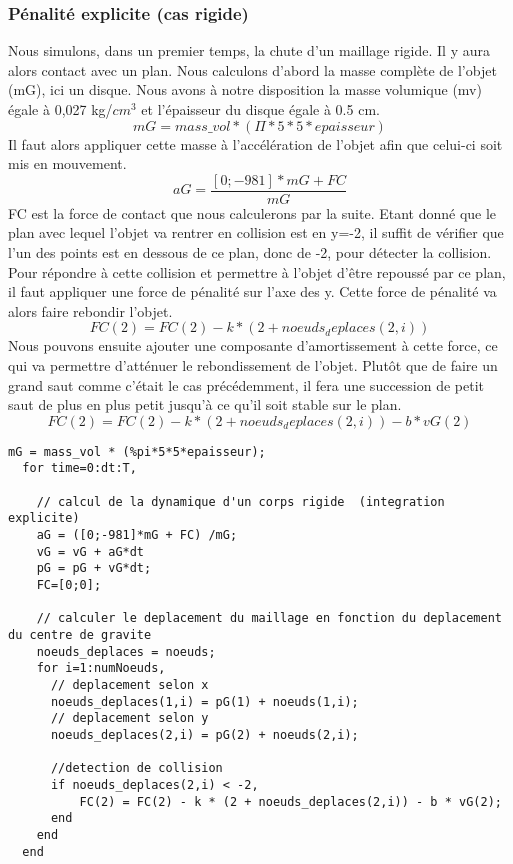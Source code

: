 \documentclass[a4paper,11pt]{article}
\begin{document}
\subsubsection{Pénalité explicite (cas rigide)}
Nous simulons, dans un premier temps, la chute d'un maillage rigide. Il y aura alors contact avec un plan.
Nous calculons d'abord la masse complète de l'objet (mG), ici un disque. Nous avons à notre disposition la 
masse volumique (mv) égale à 0,027 kg/$cm^3$ et l'épaisseur du disque égale à 0.5 cm.
\begin{equation}
  mG = mass\_vol * (\Pi*5*5*epaisseur)
\end{equation}
Il faut alors appliquer cette masse à l’accélération de l'objet afin que celui-ci soit mis en mouvement.
\begin{equation}
  aG = \frac{[0;-981]*mG + FC}{mG}
\end{equation}
FC est la force de contact que nous calculerons par la suite.
Etant donné que le plan avec lequel l'objet va rentrer en collision est en y=-2, il suffit de vérifier
que l'un des points est en dessous de ce plan, donc de -2, pour détecter la collision. Pour répondre à
cette collision et permettre à l'objet d'être repoussé par ce plan, il faut appliquer une force de pénalité
sur l'axe des y. Cette force de pénalité va alors faire rebondir l'objet.
\begin{equation}
  FC(2) = FC(2) - k * (2 + noeuds_deplaces(2,i))
\end{equation}
Nous pouvons ensuite ajouter une composante d'amortissement à cette force, ce qui va permettre d'atténuer
le rebondissement de l'objet. Plutôt que de faire un grand saut comme c'était le cas précédemment, il fera 
une succession de petit saut de plus en plus petit jusqu'à ce qu'il soit stable sur le plan.
\begin{equation}
  FC(2) = FC(2) - k * (2 + noeuds_deplaces(2,i)) - b * vG(2)
\end{equation}
\begin{lstlisting}[caption=Calcul de la pénalité explicite]
  mG = mass_vol * (%pi*5*5*epaisseur);
  for time=0:dt:T,
  
    // calcul de la dynamique d'un corps rigide  (integration explicite)
    aG = ([0;-981]*mG + FC) /mG;   
    vG = vG + aG*dt
    pG = pG + vG*dt;
    FC=[0;0];
    
    // calculer le deplacement du maillage en fonction du deplacement du centre de gravite
    noeuds_deplaces = noeuds;
    for i=1:numNoeuds,
      // deplacement selon x
      noeuds_deplaces(1,i) = pG(1) + noeuds(1,i);
      // deplacement selon y
      noeuds_deplaces(2,i) = pG(2) + noeuds(2,i);  
      
      //detection de collision
      if noeuds_deplaces(2,i) < -2,
          FC(2) = FC(2) - k * (2 + noeuds_deplaces(2,i)) - b * vG(2);
      end
    end 
  end
\end{lstlisting}
\end{document}
